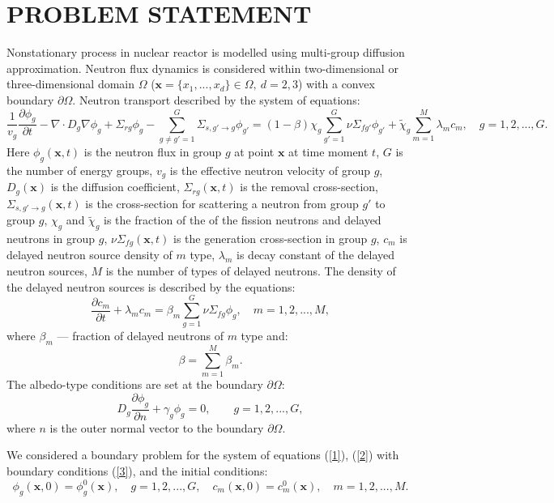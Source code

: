 \documentclass{aip-cp}
\begin{document}
\section{PROBLEM STATEMENT}
Nonstationary process in nuclear reactor is modelled using multi-group diffusion approximation. Neutron flux dynamics is considered within two-dimensional or three-dimensional domain $\Omega$ ($\bm x = \{x_1, ..., x_d\} \in \Omega, \ d = 2,3$) with a convex boundary $\partial \Omega$. Neutron transport described by the system of equations:
\begin{equation}\label{1}
\frac{1}{v_g} \frac{\partial \phi_g}{\partial t} - \nabla \cdot D_g \nabla \phi_g + \Sigma_{rg} \phi_g - \sum_{g\neq g'=1}^{G} \Sigma_{s,g'\rightarrow g} \phi_{g'} = (1-\beta) \chi_g \sum_{g'=1}^{G} \nu \Sigma_{fg'} \phi_{g'} + \widetilde{\chi}_g \sum_{m=1}^{M} \lambda_m c_m , \quad 
 g = 1,2, ..., G .
\end{equation}
Here $\phi_g(\bm x,t)$ is the neutron flux in group $g$ at point $\bm x$ at time moment $t$,
$G$ is the number of energy groups,
$v_g$ is the effective neutron velocity of group $g$,
$D_g(\bm x)$ is the diffusion coefficient, 
$\Sigma_{rg}(\bm x,t)$ is the removal cross-section,
$\Sigma_{s,g'\rightarrow g}(\bm x,t)$ is the cross-section for scattering a neutron from group $g'$ to group $g$,
$\chi_g$ and $\widetilde\chi_g$ is the fraction of the of the fission neutrons and delayed neutrons in group $g$, 
$\nu\Sigma_{fg}(\bm x,t)$ is the generation cross-section in group $g$, 
$c_m$ is delayed neutron source density of $m$ type,  $\lambda_m$ is decay constant of the delayed neutron sources,
$M$ is the number of types of delayed neutrons.
The density of the delayed neutron sources is described by the equations:
\begin{equation}\label{2}
 \frac{\partial c_m}{\partial t} + \lambda_m c_m = \beta_m \sum_{g=1}^{G} \nu \Sigma_{fg} \phi_g,
 \quad m = 1,2, ..., M, 
\end{equation} 
where $\beta_m$ --- fraction of delayed neutrons of $m$ type and:
\[
 \beta = \sum_{m=1}^{M} \beta_m .
\] 
The albedo-type conditions are set at the boundary $\partial \Omega$:
\begin{equation}\label{3}
 D_g\frac{\partial \phi_g}{\partial n} + \gamma_g \phi_g = 0, \quad 
 \quad g = 1,2, ..., G ,
\end{equation}
where $n$ is the outer normal vector to the boundary $\partial \Omega$.

We considered a boundary problem for the system of equations (\ref{1}), 
(\ref{2}) with boundary conditions (\ref{3}), and the initial conditions:
\begin{equation}\label{4}
 \phi_g(\bm x,0) = \phi_g^0(\bm x), 
  \quad  g = 1,2, ..., G ,
 \quad   c_m(\bm x,0) = c_m^0(\bm x), 
  \quad  m = 1,2, ..., M .
\end{equation} 
\end{document}
